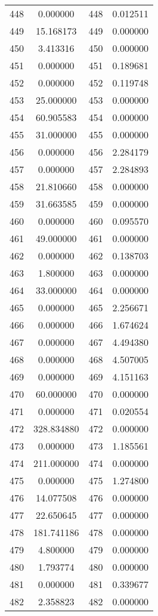 \documentclass[12pt]{article}
\begin{document}
\begin{longtable}{@{}cccc@{}}
448 & 0.000000 & 448 & 0.012511 \\
449 & 15.168173 & 449 & 0.000000 \\
450 & 3.413316 & 450 & 0.000000 \\
451 & 0.000000 & 451 & 0.189681 \\
452 & 0.000000 & 452 & 0.119748 \\
453 & 25.000000 & 453 & 0.000000 \\
454 & 60.905583 & 454 & 0.000000 \\
455 & 31.000000 & 455 & 0.000000 \\
456 & 0.000000 & 456 & 2.284179 \\
457 & 0.000000 & 457 & 2.284893 \\
458 & 21.810660 & 458 & 0.000000 \\
459 & 31.663585 & 459 & 0.000000 \\
460 & 0.000000 & 460 & 0.095570 \\
461 & 49.000000 & 461 & 0.000000 \\
462 & 0.000000 & 462 & 0.138703 \\
463 & 1.800000 & 463 & 0.000000 \\
464 & 33.000000 & 464 & 0.000000 \\
465 & 0.000000 & 465 & 2.256671 \\
466 & 0.000000 & 466 & 1.674624 \\
467 & 0.000000 & 467 & 4.494380 \\
468 & 0.000000 & 468 & 4.507005 \\
469 & 0.000000 & 469 & 4.151163 \\
470 & 60.000000 & 470 & 0.000000 \\
471 & 0.000000 & 471 & 0.020554 \\
472 & 328.834880 & 472 & 0.000000 \\
473 & 0.000000 & 473 & 1.185561 \\
474 & 211.000000 & 474 & 0.000000 \\
475 & 0.000000 & 475 & 1.274800 \\
476 & 14.077508 & 476 & 0.000000 \\
477 & 22.650645 & 477 & 0.000000 \\
478 & 181.741186 & 478 & 0.000000 \\
479 & 4.800000 & 479 & 0.000000 \\
480 & 1.793774 & 480 & 0.000000 \\
481 & 0.000000 & 481 & 0.339677 \\
482 & 2.358823 & 482 & 0.000000 \\

\end{longtable}
\end{document}
